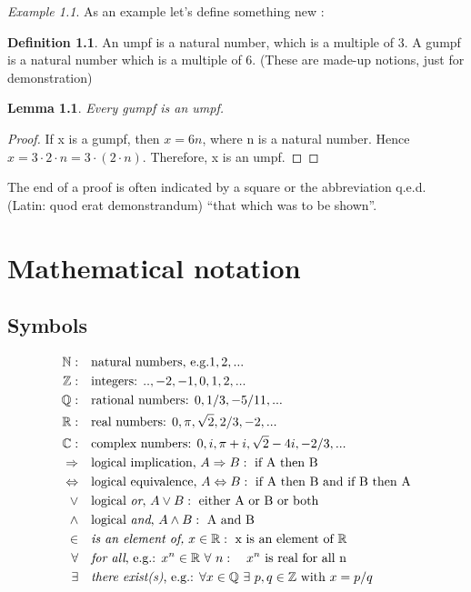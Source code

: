 \documentclass[
  a4paper,
  DIV=11,
  numbers=noendperiod,
  oneside]{scrreprt}
\theoremstyle{definition}
\theoremstyle{remark}
\begin{document}
\emph{Example 1.1}. As an example let's define something new :

\textbf{Definition 1.1}. An umpf is a natural number, which is a
multiple of 3. A gumpf is a natural number which is a multiple of 6.
(These are made-up notions, just for demonstration)

\textbf{Lemma 1.1}. \emph{Every gumpf is an umpf.}

\begin{proof}
If x is a gumpf, then \(x= 6 n\), where n is a natural number. Hence
\(x=3 \cdot 2 \cdot n = 3 \cdot (2\cdot n)\). Therefore, x is an umpf.~◻
\end{proof}

The end of a proof is often indicated by a square or the abbreviation
q.e.d. (Latin: quod erat demonstrandum) ``that which was to be shown''.

\section{Mathematical notation}\label{mathematical-notation}

\subsection*{Symbols}\label{symbols}

\[\begin{aligned}
\mathbb{N}: \quad &  \text{natural numbers, e.g.} 1,2,...\\
\mathbb{Z}: \quad &  \text{integers: } .., -2,-1,0,1,2,...\\
\mathbb{Q}: \quad &  \text{rational numbers: } 0, 1/3, -5/11,...\\
\mathbb{R}: \quad &  \text{real numbers: } 0, \pi, \sqrt{2}, 2/3, -2, ...\\
\mathbb{C}: \quad &  \text{complex numbers: } 0, i, \pi +i, \sqrt{2}-4i , -2/3,  ...\\
\Rightarrow \quad &  \text{logical implication, } A \Rightarrow B: \ \text{if A then B} \\
\Leftrightarrow \quad &  \text{logical equivalence, }  A \Leftrightarrow B: \ \text{if A then B and if B then A} \\
\vee \quad & \text{logical {\it or}, }  A \vee B: \ \text{either A or B or both} \\
\land \quad & \text{logical {\it and},  }  A \land B: \ \text{A and B} \\
\in \quad &  \text{\it is an element of,} \ x \in \mathbb{R} : \ \text{x is an element of } \mathbb{R} \\
\forall \quad &  \text{{\it for all}, e.g.: }  x^{n} \in \mathbb{R} \  \forall \ n: \  \  \ x^{n}\text{ is real for all n} \\
\exists \quad &  \text{{\it there  exist(s)}, e.g.: }  \forall x\in \mathbb{Q} \ \exists \ p,q \in \mathbb{Z} \text{ with } x=p/q
\end{aligned}\]
\end{document}

